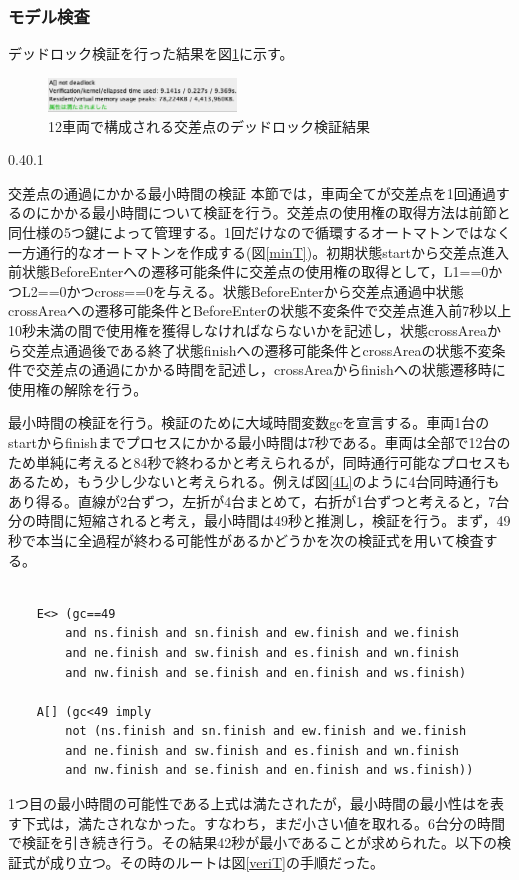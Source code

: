 \documentclass[twocolumn,10pt]{jsarticle}
\makeatletter
\renewcommand{\section}{%
   \@startsection{section}{1}{\z@}%
   {0.4\Cvs}{0.1\Cvs}%
   {\normalfont\large\headfont\raggedright}}
\makeatother
\begin{document}
	\subsubsection{モデル検査}
	デッドロック検証を行った結果を図\ref{SimV}に示す。
	\begin{figure}[htbp]
	\centering
	\includegraphics[width=50mm]{SimV.png}
	\caption{12車両で構成される交差点のデッドロック検証結果}
	\label{SimV}
	\end{figure}
	\section{交差点の通過にかかる最小時間の検証}
	本節では，車両全てが交差点を1回通過するのにかかる最小時間について検証を行う。交差点の使用権の取得方法は前節と同仕様の5つ鍵によって管理する。1回だけなので循環するオートマトンではなく一方通行的なオートマトンを作成する(図\ref{minT})。初期状態startから交差点進入前状態BeforeEnterへの遷移可能条件に交差点の使用権の取得として，L1==0かつL2==0かつcross==0を与える。状態BeforeEnterから交差点通過中状態crossAreaへの遷移可能条件とBeforeEnterの状態不変条件で交差点進入前7秒以上10秒未満の間で使用権を獲得しなければならないかを記述し，状態crossAreaから交差点通過後である終了状態finishへの遷移可能条件とcrossAreaの状態不変条件で交差点の通過にかかる時間を記述し，crossAreaからfinishへの状態遷移時に使用権の解除を行う。
	
	最小時間の検証を行う。検証のために大域時間変数gcを宣言する。車両1台のstartからfinishまでプロセスにかかる最小時間は7秒である。車両は全部で12台のため単純に考えると84秒で終わるかと考えられるが，同時通行可能なプロセスもあるため，もう少し少ないと考えられる。例えば図\ref{4L}のように4台同時通行もあり得る。直線が2台ずつ，左折が4台まとめて，右折が1台ずつと考えると，7台分の時間に短縮されると考え，最小時間は49秒と推測し，検証を行う。まず，49秒で本当に全過程が終わる可能性があるかどうかを次の検証式を用いて検査する。
	
	\begin{verbatim}
	
	E<> (gc==49 
		and ns.finish and sn.finish and ew.finish and we.finish 
		and ne.finish and sw.finish and es.finish and wn.finish 
		and nw.finish and se.finish and en.finish and ws.finish)
	
	A[] (gc<49 imply 
		not (ns.finish and sn.finish and ew.finish and we.finish 
		and ne.finish and sw.finish and es.finish and wn.finish 
		and nw.finish and se.finish and en.finish and ws.finish))
	\end{verbatim}
	1つ目の最小時間の可能性である上式は満たされたが，最小時間の最小性はを表す下式は，満たされなかった。すなわち，まだ小さい値を取れる。6台分の時間で検証を引き続き行う。その結果42秒が最小であることが求められた。以下の検証式が成り立つ。その時のルートは図\ref{veriT}の手順だった。
	
\end{document}
